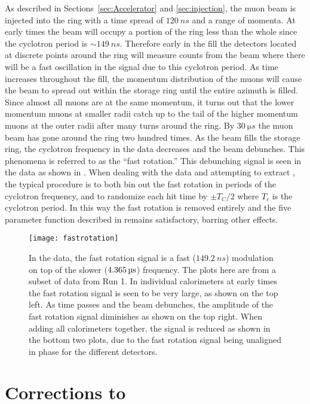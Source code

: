 As described in Sections~\ref{sec:Accelerator} and \ref{sec:injection}, the muon beam is injected into the ring with a time spread of $\SI{120}{ns}$ and a range of momenta. At early times the beam will occupy a portion of the ring less than the whole since the cyclotron period is $\sim\SI{149}{ns}$. Therefore early in the fill the detectors located at discrete points around the ring will measure counts from the beam where there will be a fast oscillation in the signal due to this cyclotron period. As time increases throughout the fill, the momentum distribution of the muons will cause the beam to spread out within the storage ring until the entire azimuth is filled. Since almost all muons are at the same momentum, it turns out that the lower momentum muons at smaller radii catch up to the tail of the higher momentum muons at the outer radii after many turns around the ring. By $\SI{30}{\micro s}$ the muon beam has gone around the ring two hundred times. As the beam fills the storage ring, the cyclotron frequency in the data decreases and the beam debunches. This phenomena is referred to as the ``fast rotation.'' This debunching signal is seen in the data as shown in . When dealing with the data and attempting to extract \wa, the typical procedure is to both bin out the fast rotation in periods of the cyclotron frequency, and to randomize each hit time by $\pm T_{C}/2$ where $T_{c}$ is the cyclotron period. In this way the fast rotation is removed entirely and the five parameter function described in  remains satisfactory, barring other effects.

\begin{figure}
    \centering
    \texttt{[image: fastrotation]}
    \caption[Beam debunching fast rotation]{In the data, the fast rotation signal is a fast ($\SI{149.2}{ns}$) modulation on top of the slower ($\SI{4.365}{\micro s}$) \wa frequency. The plots here are from a subset of data from Run 1. In individual calorimeters at early times the fast rotation signal is seen to be very large, as shown on the top left. As time passes and the beam debunches, the amplitude of the fast rotation signal diminishes as shown on the top right. When adding all calorimeters together, the signal is reduced as shown in the bottom two plots, due to the fast rotation signal being unaligned in phase for the different detectors.}
    \label{fig:fastrotation}
\end{figure}



\section{Corrections to \texorpdfstring{\wa}{wa}}
\label{sec:corrections}

